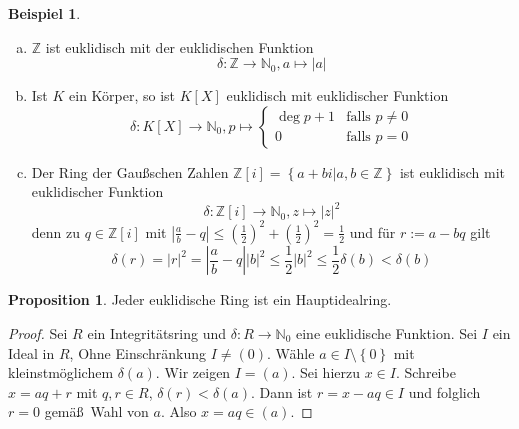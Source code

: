 \documentclass[
twoside=semi,
fontsize=12,
DIV=12, 
cleardoublepage=current,
leqno,
headings=optiontoheadandtoc, 
toc=idx
]{scrbook}
\newcommand{\N}{\mathbb{N}}
\newcommand{\Z}{\mathbb{Z}}
\newcommand{\brac}[1]{\left( #1 \right)}
\newcommand{\set}[1]{\left\{ #1 \right\}}
\theoremstyle{definition}
\newtheorem{beispiel}[definition]{Beispiel}
\newtheorem{proposition}[definition]{Proposition}
\begin{document}
	\begin{beispiel}\label{1.6.2}\hfill
		\begin{enumerate}[(a)]
			\item $\Z$ ist euklidisch mit der euklidischen Funktion 
				\[\delta: \Z \to \N_0, a \mapsto |a|\]
			\item Ist $K$ ein K\"orper, so ist $K[X]$ euklidisch mit euklidischer Funktion 
				\[\delta:K[X]\to\N_0, p \mapsto \begin{cases}
					\deg p + 1 & \textrm{falls } p \neq 0\\
					0 & \textrm{falls } p = 0
				\end{cases}\]
			\item Der Ring der Gaußschen Zahlen $\Z[i] = \set{a+bi|a,b \in \Z}$ ist euklidisch mit euklidischer Funktion 
				\[\delta: \Z[i] \to \N_0, z \mapsto |z|^2\]
			denn zu $q \in \Z[i]$ mit $\left| \frac{a}{b} - q\right| \leq \brac{\frac{1}{2}}^2 + \brac{\frac{1}{2}}^2 = \frac{1}{2}$ und f\"ur $r:= a - bq$ gilt 
				\[\delta(r) = |r|^2 = \left| \frac{a}{b} - q\right||b|^2 \leq \frac{1}{2}|b|^2 \leq \frac{1}{2}\delta(b) < \delta(b)\]
		\end{enumerate}
	\end{beispiel}

	\begin{proposition}\label{1.6.3}\hfill\newline
		Jeder euklidische Ring ist ein Hauptidealring.
		
		\begin{proof}
			Sei $R$ ein Integrit\"atsring und $\delta:R\to\N_0$ eine euklidische Funktion. Sei $I$ ein Ideal in $R$, Ohne Einschr\"ankung $I \neq (0)$. W\"ahle $a \in I\setminus\set{0}$
			mit kleinstm\"oglichem $\delta(a)$. Wir zeigen $I= (a)$. Sei hierzu $x\in I$. Schreibe $x = aq+r$ mit $q,r \in R$, $\delta(r)< \delta(a)$. Dann ist $r = x-aq \in I$ und folglich $r=0$ gem\"a\ss\ Wahl von $a$. Also $x = aq \in (a)$.
		\end{proof}
	\end{proposition}
\end{document}
